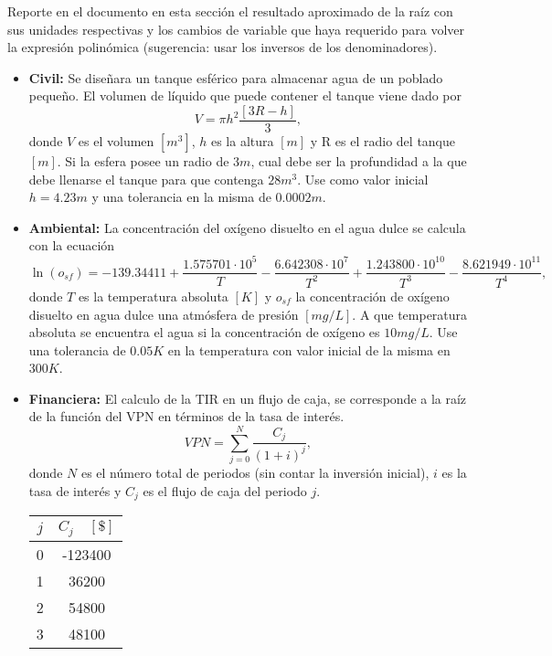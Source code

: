 \documentclass[12pt]{article}
\begin{document}
\begin{enumerate}[leftmargin=*,widest=9]
\begin{enumerate}[label=\alph*]
    Reporte en el documento en esta sección el resultado aproximado de la raíz con sus unidades respectivas y los cambios de variable que haya requerido para volver la expresión polinómica (sugerencia: usar los inversos de los denominadores).
    \end{enumerate}

    \begin{itemize}
    \item \textbf{Civil:}  Se diseñara un tanque esférico para almacenar agua de un poblado pequeño. El volumen de líquido que puede contener el tanque viene dado por
    \begin{equation*}
    V = \pi h^2 \frac{[3R - h]}{3},
    \end{equation*}
    donde \(V\) es el volumen \([m^3]\), \(h\) es la altura \([m]\) y R es el radio del tanque \([m]\). Si la esfera posee un radio de \(3m\), cual debe ser la profundidad a la que debe llenarse el tanque para que contenga \(28m^3\). Use como valor inicial \(h=4.23m\) y una tolerancia en la misma de \(0.0002m\).

    \item \textbf{Ambiental:} La concentración del oxígeno disuelto en el agua dulce se calcula con la ecuación
    \begin{equation*}
    \ln (o_{sf}) = -139.34411 + \frac{1.575701 \cdot 10^5}{T} - \frac{6.642308 \cdot 10^7}{T^2} + \frac{1.243800 \cdot 10^{10}}{T^3} - \frac{8.621949 \cdot 10^{11}}{T^4},
    \end{equation*}
    donde \(T\) es la temperatura absoluta \([K]\) y \(o_{sf}\) la concentración de oxígeno disuelto en agua dulce una atmósfera de presión \([mg/L]\). A que temperatura absoluta se encuentra el agua si la concentración de oxígeno es \(10mg/L\). Use una tolerancia de \(0.05K\) en la temperatura con valor inicial de la misma en \(300K\).

    \item \textbf{Financiera:} El calculo de la TIR en un flujo de caja, se corresponde a la raíz de la función del VPN en términos de la tasa de interés.
    \begin{equation*}
    VPN = \sum\limits_{j=0}^N \frac{C_j}{(1+i)^j},
\end{equation*}
donde \(N\) es el número total de periodos (sin contar la inversión inicial), \(i\) es la tasa de interés y \(C_j\) es el flujo de caja del periodo \(j\).

\begin{center}
\begin{tabular}{|c|c|}
\hline
\(j\) & \(C_j \quad [\$]\) \\
\hline
0 & -123400\\
1 & 36200\\
2 & 54800\\
3 & 48100\\
\hline
\end{tabular}
\end{center}


\end{itemize}
\end{enumerate}
\end{document}
